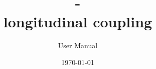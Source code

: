 \documentclass[Coupling]{../../data/TelemacDoc} %
\begin{document}
\let\cleardoublepage\clearpage

\title{\mascaret{} - \\longitudinal coupling}
\subtitle{User Manual}
\version{\telmaversion}
\date{\today}
\maketitle
\clearpage

\newpage
\thispagestyle{empty}
\TelemacCopyright{}

\pagestyle{empty}
\tableofcontents

\pagestyle{fancy}





\begin{appendices}






\end{appendices}



\end{document}

